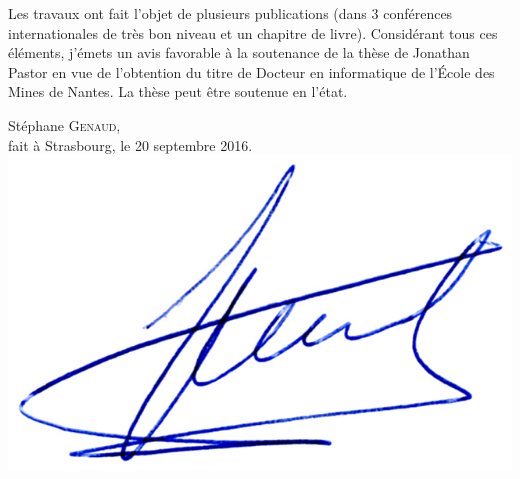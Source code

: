 \documentclass[a4paper,12pt]{article}
\begin{document}
Les  travaux ont  fait l'objet  de  plusieurs publications  (dans 3  conférences
internationales de très  bon niveau et un chapitre de  livre).  Considérant tous
ces éléments, j'émets un avis favorable à  la soutenance de la thèse de Jonathan
Pastor en vue de l'obtention du titre  de Docteur en informatique de l'École des
Mines de Nantes. La thèse peut être soutenue en l'état.

\vspace{.8cm}
\begin{flushright}
Stéphane \textsc{Genaud},\\
{\small fait à Strasbourg, le 20 septembre 2016}.\\
\includegraphics[width=.20\textwidth]{signgenaud.jpg}
\end{flushright}
\end{document}
